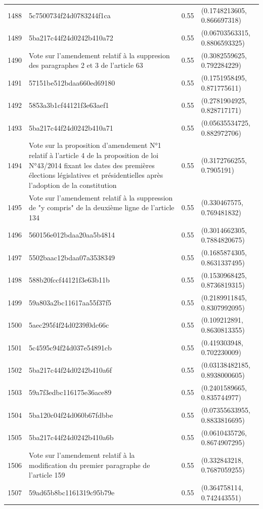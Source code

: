 \begin{table}[ht]
\begin{tabular}{rlrl}
  1488 & 5c7500734f24d0783244f1ca & 0.55 & (0.1748213605, 0.866697318) \\ 
  1489 & 5ba217c44f24d0242b410a72 & 0.55 & (0.06703563315, 0.8806593325) \\ 
  1490 & Vote sur l'amendement relatif à la suppresion des paragraphes 2 et 3 de l'article 63 & 0.55 & (0.3082559625, 0.792284229) \\ 
  1491 & 57151be512bdaa660ed69180 & 0.55 & (0.1751958495, 0.871775611) \\ 
  1492 & 5853a3b1cf44121f3e63aef1 & 0.55 & (0.2781904925, 0.828717171) \\ 
  1493 & 5ba217c44f24d0242b410a71 & 0.55 & (0.05635534725, 0.882972706) \\ 
  1494 & Vote sur la proposition d'amendement N°1 relatif à l'article 4 de la proposition de loi N°43/2014 fixant les dates des premières élections législatives et présidentielles après l'adoption de la constitution & 0.55 & (0.3172766255, 0.7905191) \\ 
  1495 & Vote sur l'amendement relatif à la suppression de "y compris" de la deuxième ligne de l'article 134 & 0.55 & (0.330467575, 0.769481832) \\ 
  1496 & 560156e012bdaa20aa5b4814 & 0.55 & (0.3014662305, 0.7884820675) \\ 
  1497 & 5502baac12bdaa07a3538349 & 0.55 & (0.1685874305, 0.8631337495) \\ 
  1498 & 588b20fccf44121f3e63b11b & 0.55 & (0.1530968425, 0.8736819315) \\ 
  1499 & 59a803a2bc11617aa55f37f5 & 0.55 & (0.2189911845, 0.8307992095) \\ 
  1500 & 5aec295f4f24d0239f0dc66c & 0.55 & (0.109212891, 0.8630813355) \\ 
  1501 & 5c4595c94f24d037e54891cb & 0.55 & (0.419303948, 0.702230009) \\ 
  1502 & 5ba217c44f24d0242b410a6f & 0.55 & (0.03138482185, 0.8938000605) \\ 
  1503 & 59a7f3edbc116175e36ace89 & 0.55 & (0.2401589665, 0.835744977) \\ 
  1504 & 5ba120c04f24d060b67fdbbe & 0.55 & (0.07355633955, 0.8833816695) \\ 
  1505 & 5ba217c44f24d0242b410a6b & 0.55 & (0.0610435726, 0.8674907295) \\ 
  1506 & Vote sur l'amendement relatif à la modification du premier paragraphe de l'article 159 & 0.55 & (0.332843218, 0.7687059255) \\ 
  1507 & 59ad65b8bc1161319c95b79e & 0.55 & (0.364758114, 0.742443551) \\ 

\end{tabular}
\end{table}
